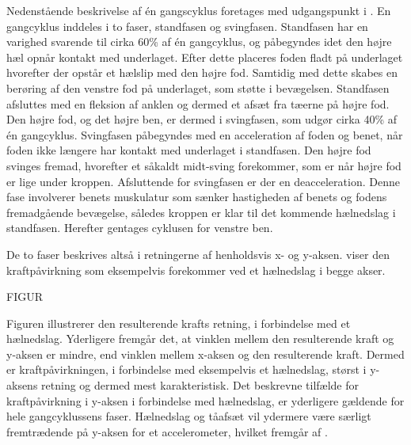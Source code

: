 Nedenstående beskrivelse af én gangscyklus foretages med udgangspunkt i . \newline
En gangcyklus inddeles i to faser, standfasen og svingfasen.
Standfasen har en varighed svarende til cirka 60\% af én gangcyklus, og påbegyndes idet den højre hæl opnår kontakt med underlaget. Efter dette placeres foden fladt på underlaget hvorefter der opstår et hælslip med den højre fod. Samtidig med dette skabes en berøring af den venstre fod på underlaget, som støtte i bevægelsen. Standfasen afsluttes med en fleksion af anklen og dermed et afsæt fra tæerne på højre fod.\citep{VaughanDavisOConnor1992,Whittle1990}  \newline 
Den højre fod, og det højre ben, er dermed i svingfasen, som udgør cirka 40\% af én gangcyklus. Svingfasen påbegyndes med en acceleration af foden og benet, når foden ikke længere har kontakt med underlaget i standfasen. Den højre fod svinges fremad, hvorefter et såkaldt midt-sving forekommer, som er når højre fod er lige under kroppen. Afsluttende for svingfasen er der en deacceleration. Denne fase involverer benets muskulatur som sænker hastigheden af benets og fodens fremadgående bevægelse, således kroppen er klar til det kommende hælnedslag i standfasen. Herefter gentages cyklusen for venstre ben.\citep{VaughanDavisOConnor1992,Whittle1990}

De to faser beskrives altså i retningerne af henholdsvis x- og y-aksen.  viser den kraftpåvirkning som eksempelvis forekommer ved et hælnedslag i begge akser.  

FIGUR


Figuren illustrerer den resulterende krafts retning, i forbindelse med et hælnedslag. Yderligere fremgår det, at vinklen mellem den resulterende kraft og y-aksen er mindre, end vinklen mellem x-aksen og den resulterende kraft. Dermed er kraftpåvirkningen, i forbindelse med eksempelvis et hælnedslag, størst i y-aksens retning og dermed mest karakteristisk. \newline
Det beskrevne tilfælde for kraftpåvirkning i y-aksen i forbindelse med hælnedslag, er yderligere gældende for hele gangcyklussens faser. \citep{Rueterbories2010,Serway2010,ClelandKikhia2013} \newline
Hælnedslag og tåafsæt vil ydermere være særligt fremtrædende på y-aksen for et accelerometer, hvilket fremgår af . 


